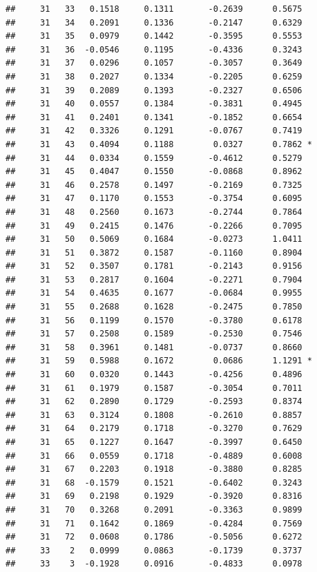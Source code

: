 \documentclass[
]{article}
\begin{document}
\begin{verbatim}
##     31   33   0.1518     0.1311       -0.2639      0.5675  
##     31   34   0.2091     0.1336       -0.2147      0.6329  
##     31   35   0.0979     0.1442       -0.3595      0.5553  
##     31   36  -0.0546     0.1195       -0.4336      0.3243  
##     31   37   0.0296     0.1057       -0.3057      0.3649  
##     31   38   0.2027     0.1334       -0.2205      0.6259  
##     31   39   0.2089     0.1393       -0.2327      0.6506  
##     31   40   0.0557     0.1384       -0.3831      0.4945  
##     31   41   0.2401     0.1341       -0.1852      0.6654  
##     31   42   0.3326     0.1291       -0.0767      0.7419  
##     31   43   0.4094     0.1188        0.0327      0.7862 *
##     31   44   0.0334     0.1559       -0.4612      0.5279  
##     31   45   0.4047     0.1550       -0.0868      0.8962  
##     31   46   0.2578     0.1497       -0.2169      0.7325  
##     31   47   0.1170     0.1553       -0.3754      0.6095  
##     31   48   0.2560     0.1673       -0.2744      0.7864  
##     31   49   0.2415     0.1476       -0.2266      0.7095  
##     31   50   0.5069     0.1684       -0.0273      1.0411  
##     31   51   0.3872     0.1587       -0.1160      0.8904  
##     31   52   0.3507     0.1781       -0.2143      0.9156  
##     31   53   0.2817     0.1604       -0.2271      0.7904  
##     31   54   0.4635     0.1677       -0.0684      0.9955  
##     31   55   0.2688     0.1628       -0.2475      0.7850  
##     31   56   0.1199     0.1570       -0.3780      0.6178  
##     31   57   0.2508     0.1589       -0.2530      0.7546  
##     31   58   0.3961     0.1481       -0.0737      0.8660  
##     31   59   0.5988     0.1672        0.0686      1.1291 *
##     31   60   0.0320     0.1443       -0.4256      0.4896  
##     31   61   0.1979     0.1587       -0.3054      0.7011  
##     31   62   0.2890     0.1729       -0.2593      0.8374  
##     31   63   0.3124     0.1808       -0.2610      0.8857  
##     31   64   0.2179     0.1718       -0.3270      0.7629  
##     31   65   0.1227     0.1647       -0.3997      0.6450  
##     31   66   0.0559     0.1718       -0.4889      0.6008  
##     31   67   0.2203     0.1918       -0.3880      0.8285  
##     31   68  -0.1579     0.1521       -0.6402      0.3243  
##     31   69   0.2198     0.1929       -0.3920      0.8316  
##     31   70   0.3268     0.2091       -0.3363      0.9899  
##     31   71   0.1642     0.1869       -0.4284      0.7569  
##     31   72   0.0608     0.1786       -0.5056      0.6272  
##     33    2   0.0999     0.0863       -0.1739      0.3737  
##     33    3  -0.1928     0.0916       -0.4833      0.0978  

\end{verbatim}
\end{document}
